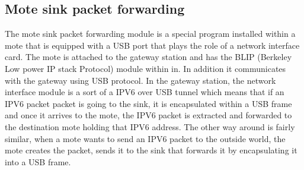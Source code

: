 \documentclass[conference]{IEEEtran}
\begin{document}
\subsection{Mote sink packet forwarding}
The mote sink packet forwarding module is a special program installed within a mote that is equipped with a USB port that plays the role of a network interface card. The mote is attached to the gateway station and has the BLIP (Berkeley Low power IP stack Protocol) module within in. In addition it communicates with the gateway using USB protocol. In the gateway station, the network interface module is a sort of a IPV6 over USB tunnel which means that if an IPV6 packet packet is going to the sink, it is encapsulated within a USB frame and once it arrives to the mote, the IPV6 packet is extracted and forwarded to the destination mote holding that IPV6 address. The other way around is fairly similar, when a mote wants to send an IPV6 packet to the outside world, the mote creates the packet, sends it to the sink that forwards it by encapsulating it into a USB frame.
\end{document}
